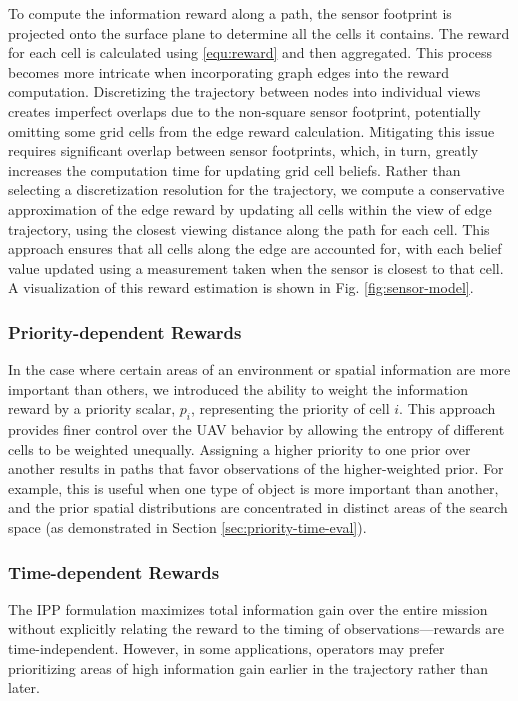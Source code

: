 To compute the information reward along a path, the sensor footprint is projected onto the surface plane to determine all the cells it contains. The reward for each cell is calculated using \eqref{equ:reward} and then aggregated. This process becomes more intricate when incorporating graph edges into the reward computation. Discretizing the trajectory between nodes into individual views creates imperfect overlaps due to the non-square sensor footprint, potentially omitting some grid cells from the edge reward calculation. Mitigating this issue requires significant overlap between sensor footprints, which, in turn, greatly increases the computation time for updating grid cell beliefs.
Rather than selecting a discretization resolution for the trajectory, we compute a conservative approximation of the edge reward by updating all cells within the view of edge trajectory, using the closest viewing distance along the path for each cell.
This approach ensures that all cells along the edge are accounted for, with each belief value updated using a measurement taken when the sensor is closest to that cell. A visualization of this reward estimation is shown in Fig. \ref{fig:sensor-model}.


\subsubsection{Priority-dependent Rewards}\label{sec:priority}
In the case where certain areas of an environment or spatial information are more important than others, we introduced the ability to weight the information reward by a priority scalar, $p_i$, representing the priority of cell $i$. This approach provides finer control over the UAV behavior by allowing the entropy of different cells to be weighted unequally. Assigning a higher priority to one prior over another results in paths that favor observations of the higher-weighted prior. For example, this is useful when one type of object is more important than another, and the prior spatial distributions are concentrated in distinct areas of the search space (as demonstrated in Section \ref{sec:priority-time-eval}).

\subsubsection{Time-dependent Rewards}
The IPP formulation maximizes total information gain over the entire mission without explicitly relating the reward to the timing of observations---rewards are time-independent. However, in some applications, operators may prefer prioritizing areas of high information gain earlier in the trajectory rather than later.

